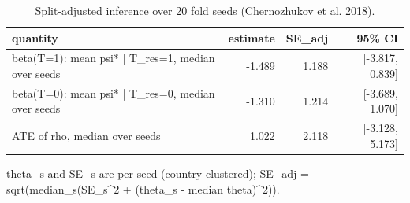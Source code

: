 \begin{table}[htbp]
\centering
\caption{Split-adjusted inference over 20 fold seeds (Chernozhukov et al. 2018).}
\label{tab:agri_split}
\begin{tabular}{lrrr}
\toprule
quantity & estimate & SE\_adj & 95\% CI \\
\midrule
beta(T=1): mean psi* | T\_res=1, median over seeds & -1.489 & 1.188 & [-3.817, 0.839] \\
beta(T=0): mean psi* | T\_res=0, median over seeds & -1.310 & 1.214 & [-3.689, 1.070] \\
ATE of rho, median over seeds & 1.022 & 2.118 & [-3.128, 5.173] \\
\bottomrule
\end{tabular}
\par\smallskip\footnotesize theta\_s and SE\_s are per seed (country-clustered); SE\_adj = sqrt(median\_s(SE\_s^2 + (theta\_s - median theta)^2)).
\end{table}
